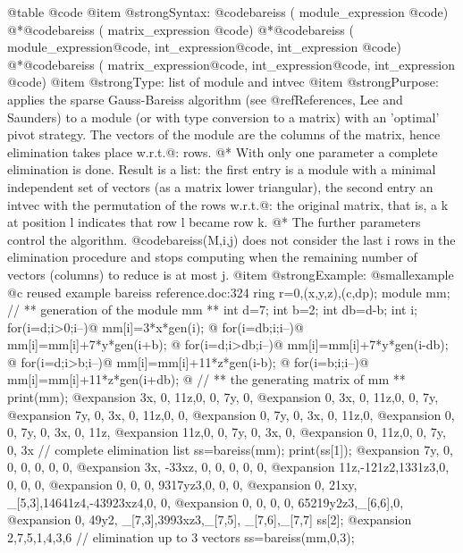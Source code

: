 @table @code
@item @strong{Syntax:}
@code{bareiss (} module_expression @code{)}
@*@code{bareiss (} matrix_expression @code{)}
@*@code{bareiss (} module_expression@code{,} int_expression@code{,} int_expression @code{)}
@*@code{bareiss (} matrix_expression@code{,} int_expression@code{,} int_expression @code{)}
@item @strong{Type:}
list of module and intvec
@item @strong{Purpose:}
applies the sparse Gauss-Bareiss algorithm (see @ref{References}, Lee and
Saunders) to a module (or with type conversion to a matrix) with an 'optimal'
pivot strategy. The vectors of the module are the columns of the matrix,
hence elimination takes place w.r.t.@: rows.
@* With only one parameter a complete elimination is done.
Result is a list: the first entry is a module with a minimal independent set
of vectors (as a matrix lower triangular),
the second entry an intvec with the permutation of the rows
w.r.t.@: the original matrix, that is, a k at position l indicates that
row l became row k.
@* The further parameters control the algorithm. @code{bareiss(M,i,j)}
does not consider the last i rows in the elimination procedure and stops
computing when the remaining number of vectors (columns) to reduce is at
most j.
@item @strong{Example:}
@smallexample
@c reused example bareiss reference.doc:324 
  ring r=0,(x,y,z),(c,dp);
  module mm;
  // ** generation of the module mm **
  int d=7;
  int b=2;
  int db=d-b;
  int i;
  for(i=d;i>0;i--)@{ mm[i]=3*x*gen(i); @}
  for(i=db;i;i--)@{ mm[i]=mm[i]+7*y*gen(i+b); @}
  for(i=d;i>db;i--)@{ mm[i]=mm[i]+7*y*gen(i-db); @}
  for(i=d;i>b;i--)@{ mm[i]=mm[i]+11*z*gen(i-b); @}
  for(i=b;i;i--)@{ mm[i]=mm[i]+11*z*gen(i+db); @}
  // ** the generating matrix of mm **
  print(mm);
@expansion{} 3x, 0,  11z,0,  0,  7y, 0,  
@expansion{} 0,  3x, 0,  11z,0,  0,  7y, 
@expansion{} 7y, 0,  3x, 0,  11z,0,  0,  
@expansion{} 0,  7y, 0,  3x, 0,  11z,0,  
@expansion{} 0,  0,  7y, 0,  3x, 0,  11z,
@expansion{} 11z,0,  0,  7y, 0,  3x, 0,  
@expansion{} 0,  11z,0,  0,  7y, 0,  3x  
  // complete elimination
  list ss=bareiss(mm);
  print(ss[1]);
@expansion{} 7y, 0,     0,     0,      0,        0,     0,    
@expansion{} 3x, -33xz, 0,     0,      0,        0,     0,    
@expansion{} 11z,-121z2,1331z3,0,      0,        0,     0,    
@expansion{} 0,  0,     0,     9317yz3,0,        0,     0,    
@expansion{} 0,  21xy,  _[5,3],14641z4,-43923xz4,0,     0,    
@expansion{} 0,  0,     0,     0,      65219y2z3,_[6,6],0,    
@expansion{} 0,  49y2,  _[7,3],3993xz3,_[7,5],   _[7,6],_[7,7]
  ss[2];
@expansion{} 2,7,5,1,4,3,6
  // elimination up to 3 vectors
  ss=bareiss(mm,0,3);
